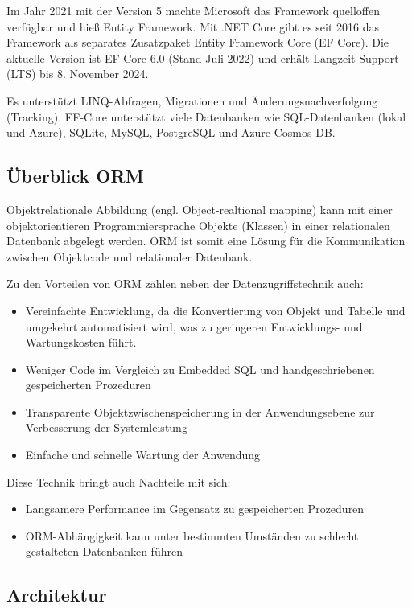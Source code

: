 Im Jahr 2021 mit der Version 5 machte Microsoft das Framework quelloffen verfügbar und hieß
Entity Framework. Mit .NET Core gibt es seit 2016 das Framework als separates Zusatzpaket Entity
Framework Core (EF Core). Die aktuelle Version ist EF Core 6.0 (Stand Juli 2022) und 
erhält Langzeit-Support (LTS) bis 8. November 2024.

Es unterstützt LINQ-Abfragen, Migrationen und Änderungsnachverfolgung (Tracking). EF-Core
unterstützt viele Datenbanken wie SQL-Datenbanken (lokal und Azure), SQLite, MySQL, PostgreSQL
und Azure Cosmos DB.

\subsection{Überblick ORM}
Objektrelationale Abbildung (engl. Object-realtional mapping) kann mit einer objektorientieren
Programmiersprache Objekte (Klassen) in einer relationalen Datenbank abgelegt werden. ORM ist
somit eine Lösung für die Kommunikation zwischen Objektcode und relationaler Datenbank.

Zu den Vorteilen von ORM zählen neben der Datenzugriffstechnik auch:

\begin{itemize}
    \item Vereinfachte Entwicklung, da die Konvertierung von Objekt und Tabelle und umgekehrt
    automatisiert wird, was zu geringeren Entwicklungs- und Wartungskosten führt.
    \item Weniger Code im Vergleich zu Embedded SQL und handgeschriebenen gespeicherten
    Prozeduren
    \item Transparente Objektzwischenspeicherung in der Anwendungsebene zur Verbesserung der
    Systemleistung
    \item Einfache und schnelle Wartung der Anwendung
\end{itemize}

Diese Technik bringt auch Nachteile mit sich:

\begin{itemize}
    \item Langsamere Performance im Gegensatz zu gespeicherten Prozeduren
    \item ORM-Abhängigkeit kann unter bestimmten Umständen zu schlecht gestalteten
    Datenbanken führen
\end{itemize}

\subsection{Architektur}

